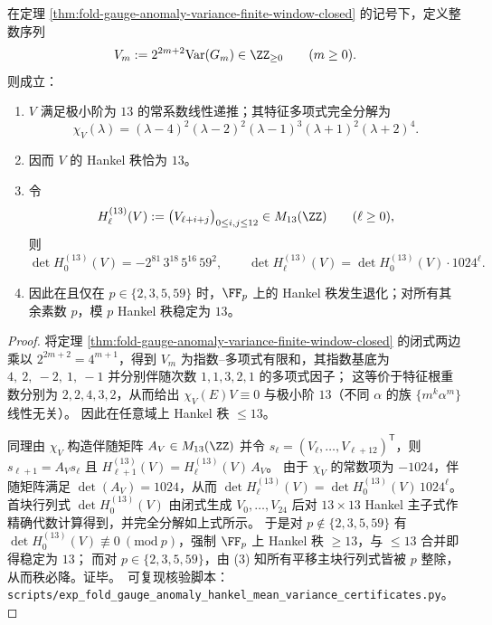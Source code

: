 \begin{theorem}\label{thm:fold-gauge-anomaly-variance-hankel-rigidity-rank13-prime59}
在定理 \ref{thm:fold-gauge-anomaly-variance-finite-window-closed} 的记号下，定义整数序列
\[
V_m:=2^{2m+2}\mathrm{Var}(G_m)\in\ZZ_{\ge 0}\qquad(m\ge 0).
\]
则成立：
\begin{enumerate}
  \item \(V\) 满足极小阶为 \(13\) 的常系数线性递推；其特征多项式完全分解为
  \[
  \chi_V(\lambda)=(\lambda-4)^2(\lambda-2)^2(\lambda-1)^3(\lambda+1)^2(\lambda+2)^4.
  \]
  \item 因而 \(V\) 的 Hankel 秩恰为 \(13\)。
  \item 令
  \[
  H^{(13)}_{\ell}(V):=\bigl(V_{\ell+i+j}\bigr)_{0\le i,j\le 12}\in M_{13}(\ZZ)
  \qquad(\ell\ge 0),
  \]
  则
  \[
  \det H^{(13)}_{0}(V)=-2^{81}\,3^{18}\,5^{16}\,59^{2},
  \qquad
  \det H^{(13)}_{\ell}(V)=\det H^{(13)}_{0}(V)\cdot 1024^{\ell}.
  \]
  \item 因此在且仅在 \(p\in\{2,3,5,59\}\) 时，\(\FF_p\) 上的 Hankel 秩发生退化；对所有其余素数 \(p\)，模 \(p\) Hankel 秩稳定为 \(13\)。
\end{enumerate}
\end{theorem}
\begin{proof}
将定理 \ref{thm:fold-gauge-anomaly-variance-finite-window-closed} 的闭式两边乘以 \(2^{2m+2}=4^{m+1}\)，得到 \(V_m\) 为指数--多项式有限和，其指数基底为
\(
4,\ 2,\ -2,\ 1,\ -1
\)
并分别伴随次数 \(1,1,3,2,1\) 的多项式因子；
这等价于特征根重数分别为 \(2,2,4,3,2\)，从而给出 \(\chi_V(E)V\equiv 0\) 与极小阶 \(13\)（不同 \(\alpha\) 的族 \(\{m^k\alpha^m\}\) 线性无关）。
因此在任意域上 Hankel 秩 \(\le 13\)。
\par
同理由 \(\chi_V\) 构造伴随矩阵 \(A_V\in M_{13}(\ZZ)\) 并令 \(s_\ell=(V_\ell,\dots,V_{\ell+12})^{\mathsf T}\)，则 \(s_{\ell+1}=A_V s_\ell\) 且
\(
H^{(13)}_{\ell+1}(V)=H^{(13)}_{\ell}(V)\,A_V
\)。
由于 \(\chi_V\) 的常数项为 \(-1024\)，伴随矩阵满足 \(\det(A_V)=1024\)，从而
\(
\det H^{(13)}_{\ell}(V)=\det H^{(13)}_0(V)\,1024^\ell
\)。
首块行列式 \(\det H^{(13)}_0(V)\) 由闭式生成 \(V_0,\dots,V_{24}\) 后对 \(13\times 13\) Hankel 主子式作精确代数计算得到，并完全分解如上式所示。
于是对 \(p\notin\{2,3,5,59\}\) 有 \(\det H^{(13)}_0(V)\not\equiv 0\ (\mathrm{mod}\ p)\)，强制 \(\FF_p\) 上 Hankel 秩 \(\ge 13\)，与 \(\le 13\) 合并即得稳定为 \(13\)；
而对 \(p\in\{2,3,5,59\}\)，由 (3) 知所有平移主块行列式皆被 \(p\) 整除，从而秩必降。证毕。\
可复现核验脚本：\texttt{scripts/exp\_fold\_gauge\_anomaly\_hankel\_mean\_variance\_certificates.py}。
\end{proof}

